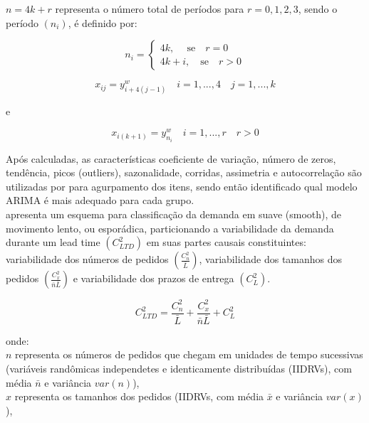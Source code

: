 \documentclass[11pt,letterpaper,twocolumn]{article}
\begin{document}
$n=4k+r$ representa o número total de períodos para $r = 0, 1, 2, 3$, sendo o período $(n_i)$, é definido por:

\begin{equation}
n_i = 
\begin{cases}
4k, \ \quad \mathrm{se} \quad r =0 \\
4k + i, \quad \mathrm{se} \quad r > 0
\end{cases}
\end{equation}

\begin{equation}
x_{ij} = y_{i+4(j-1)}^w \quad i = 1,...,4 \quad j=1,...,k
\end{equation}

e

\begin{equation}
x_{i(k+1)} = y_{n_i}^w \quad i = 1,...,r \quad r>0
\end{equation}

Após calculadas, as características coeficiente de variação, número de zeros, tendência, picos (outliers), sazonalidade, corridas, assimetria e autocorrelação são utilizadas por \cite{BusingerRead1999} para agurpamento dos itens, sendo então identificado qual modelo ARIMA é mais adequado para cada grupo. \\

\cite{Williams1984} apresenta um esquema para classificação da demanda em suave (smooth), de movimento lento, ou esporádica, particionando a variabilidade da demanda durante um lead time $(C_{LTD}^{2})$ em suas partes causais constituintes: variabilidade dos números de pedidos $(\frac{C_{n}^{2}}{\bar{L}})$, variabilidade dos tamanhos dos pedidos $(\frac{C_{x}^{2}}{\bar{n}\bar{L}})$ e variabilidade dos prazos de entrega $(C_{L}^{2})$. 

\begin{equation}
C_{LTD}^{2} = \frac{C_{n}^{2}}{\bar{L}} + \frac{C_{x}^{2}}{\bar{n}\bar{L}} + C_{L}^{2}
\end{equation}

onde: \\

$n$ representa os números de pedidos que chegam em unidades de tempo sucessivas (variáveis randômicas independetes e identicamente distribuídas (IIDRVs), com média $\bar{n}$ e variância $var(n)$), \\

$x$ representa os tamanhos dos pedidos (IIDRVs, com média $\bar{x}$ e variância $var(x)$),  \\
\end{document}
